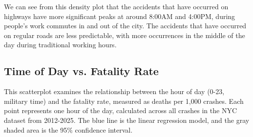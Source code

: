 \documentclass[10pt]{article}\usepackage[]{graphicx}\usepackage[]{xcolor}
\begin{document}
We can see from this density plot that the accidents that have occurred on highways have more significant peaks at around 8:00AM and 4:00PM, during people’s work commutes in and out of the city. The accidents that have occurred on regular roads are less predictable, with more occurrences in the middle of the day during traditional working hours.


\subsection{Time of Day vs. Fatality Rate}

This scatterplot examines the relationship between the hour of day (0-23, military time) and the fatality rate, measured as deaths per 1,000 crashes. Each point represents one hour of the day, calculated across all crashes in the NYC dataset from 2012-2025. The blue line is the linear regression model, and the gray shaded area is the 95\% confidence interval.
\end{document}
